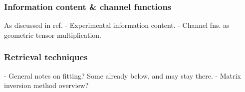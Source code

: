 




\subsubsection{Information content \& channel functions}

As discussed in ref. \cite{hockett2018QMP2}
- Experimental information content.
- Channel fns. as geometric tensor multiplication.


\subsubsection{Retrieval techniques}

- General notes on fitting? Some already below, and may stay there.
- Matrix inversion method overview?
